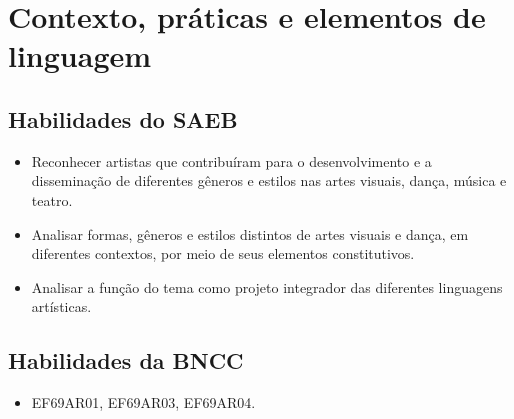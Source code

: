 \chapter{Contexto, práticas e elementos de linguagem}

\section{Habilidades do SAEB}

\begin{itemize}
  \item Reconhecer artistas que contribuíram para o desenvolvimento e a disseminação de diferentes gêneros 
  e estilos nas artes visuais, dança, música e teatro.
  \item Analisar formas, gêneros e estilos distintos de artes visuais e dança, em diferentes contextos, por 
  meio de seus elementos constitutivos.
  \item Analisar a função do tema como projeto integrador das diferentes linguagens artísticas.
\end{itemize}

\section*{Habilidades da BNCC}

\begin{itemize}
  \item EF69AR01, EF69AR03, EF69AR04.
\end{itemize}


